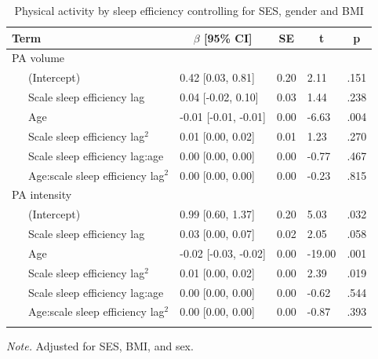 \documentclass[
  man]{apa6}
\begin{document}
\begin{table}[tbp]

\begin{center}
\begin{threeparttable}

\caption{\label{tab:PA-by-sleep-efficiency}Physical activity by sleep efficiency controlling for SES, gender and BMI}

\begin{tabular}{lllll}
\toprule
Term & \multicolumn{1}{c}{$\beta$ [95\% CI]} & \multicolumn{1}{c}{SE} & \multicolumn{1}{c}{t} & \multicolumn{1}{c}{p}\\
\midrule
PA volume &  &  &  & \\
\ \ \ (Intercept) & 0.42 [0.03, 0.81] & 0.20 & 2.11 & .151\\
\ \ \ Scale sleep efficiency lag & 0.04 [-0.02, 0.10] & 0.03 & 1.44 & .238\\
\ \ \ Age & -0.01 [-0.01, -0.01] & 0.00 & -6.63 & .004\\
\ \ \ Scale sleep efficiency lag$^2$ & 0.01 [0.00, 0.02] & 0.01 & 1.23 & .270\\
\ \ \ Scale sleep efficiency lag:age & 0.00 [0.00, 0.00] & 0.00 & -0.77 & .467\\
\ \ \ Age:scale sleep efficiency lag$^2$ & 0.00 [0.00, 0.00] & 0.00 & -0.23 & .815\\
PA intensity &  &  &  & \\
\ \ \ (Intercept) & 0.99 [0.60, 1.37] & 0.20 & 5.03 & .032\\
\ \ \ Scale sleep efficiency lag & 0.03 [0.00, 0.07] & 0.02 & 2.05 & .058\\
\ \ \ Age & -0.02 [-0.03, -0.02] & 0.00 & -19.00 & .001\\
\ \ \ Scale sleep efficiency lag$^2$ & 0.01 [0.00, 0.02] & 0.00 & 2.39 & .019\\
\ \ \ Scale sleep efficiency lag:age & 0.00 [0.00, 0.00] & 0.00 & -0.62 & .544\\
\ \ \ Age:scale sleep efficiency lag$^2$ & 0.00 [0.00, 0.00] & 0.00 & -0.87 & .393\\
\bottomrule
\addlinespace
\end{tabular}

\begin{tablenotes}[para]
\normalsize{\textit{Note.} Adjusted for SES, BMI, and sex. }
\end{tablenotes}

\end{threeparttable}
\end{center}

\end{table}
\end{document}
